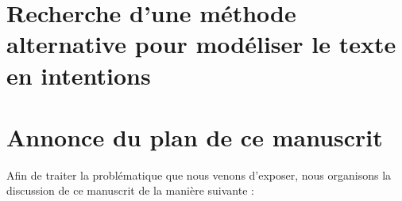 	\section*{Recherche d'une méthode alternative pour modéliser le texte en intentions}
		
		
		
	\section*{Annonce du plan de ce manuscrit}
		
		Afin de traiter la problématique que nous venons d'exposer, nous organisons la discussion de ce manuscrit de la manière suivante :
		
